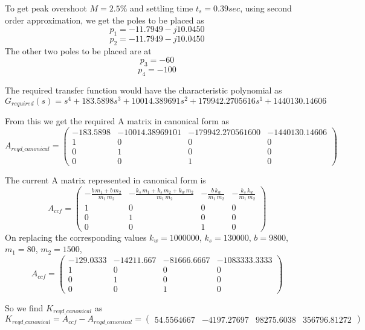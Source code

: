 \documentclass{article}
\newenvironment{answer}[2][Answer]{\begin{trivlist}
  \item[\hskip \labelsep {\bfseries #1}\hskip \labelsep {\bfseries #2:}]}{\end{trivlist}}
\begin{document}
\begin{answer}h
  To get peak overshoot $M=2.5\%$ and settling time $t_s = 0.39sec$, using second order approximation, we get the poles to be placed as
  $$p_1 = -11.7949 -j 10.0450$$
  $$p_2 = -11.7949 -j 10.0450$$
  The other two poles to be placed are at $$p_3 = -60$$ $$p_4 = -100$$

  The required transfer function would have the characteristic polynomial as
  $$G_{required}(s) = s^4 + 183.5898s^3 + 10014.389691s^2 + 179942.2705616s^1 + 1440130.14606$$

  From this we get the required A matrix in canonical form as
  $$A_{reqd\_canonical} = \left(\begin{array}{cccc} - 183.5898 & - 10014.38969101 & -179942.270561600 & -1440130.14606 \\ 1 & 0 & 0 & 0\\ 0 & 1 & 0 & 0\\ 0 & 0 & 1 & 0 \end{array}\right)$$

  The current A matrix represented in canonical form is
  $$A_{ccf} = \left(\begin{array}{cccc} -\frac{b\, m_{1} + b\, m_{2}}{m_{1}\, m_{2}} & -\frac{k_{s}\, m_{1} + k_{s}\, m_{2} + k_{w}\, m_{2}}{m_{1}\, m_{2}} & -\frac{b\, k_{w}}{m_{1}\, m_{2}} & -\frac{k_{s}\, k_{w}}{m_{1}\, m_{2}}\\ 1 & 0 & 0 & 0\\ 0 & 1 & 0 & 0\\ 0 & 0 & 1 & 0 \end{array}\right)$$
  On replacing the corresponding values $k_w = 1000000$, $k_s = 130000$, $b = 9800$, $m_1 = 80$, $m_2 = 1500$,
  $$A_{ccf} = \left(\begin{array}{cccc} -129.0333 & -14211.667 & -81666.6667 & -1083333.3333 \\ 1 & 0 & 0 & 0\\ 0 & 1 & 0 & 0\\ 0 & 0 & 1 & 0 \end{array}\right)$$

  So we find $K_{reqd\_canonical}$ as
  $$K_{reqd\_canonical} = A_{ccf} - A_{reqd\_canonical} = \left(\begin{array}{cccc} 54.5564667 & -4197.27697 & 98275.6038 & 356796.81272 \end{array}\right)$$


\end{answer}
\end{document}
